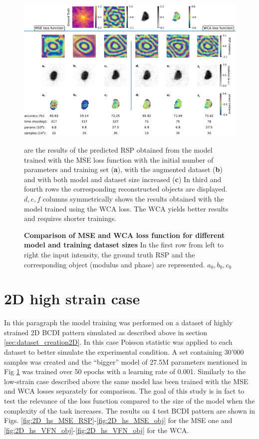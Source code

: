 \begin{figure}[H]
    \centering
    \includegraphics[width=\textwidth]{figures/Phasing/model_comparison.pdf}
    \caption{\textbf{Comparison of MSE and WCA loss function for different model and training dataset sizes} In the first 
    row from left to right the input intensity, the ground truth RSP and the corresponding object (modulus and phase) are 
    represented. \textbf{$a_0, b_0, c_0$}} are the results of the predicted RSP obtained from the model trained with the 
    MSE loss function with the initial number of parameters and training set (\textbf{a}), with the augmented dataset (\textbf{b})
    and with both model and dataset size increased (\textbf{c}) In third and fourth rows the corresponding reconstructed 
    objects are displayed. \textbf{$d, e, f$} columns symmetrically shows the results obtained with the model trained using the WCA loss. 
    The WCA yields better results and requires shorter trainings. 
    \label{fig:loss_comparison}
\end{figure}

\section{2D high strain case}

In this paragraph the model training was performed on a dataset of highly strained 2D BCDI pattern simulated as described above  
in section \ref{sec:dataset_creation2D}. In this case Poisson statistic was applied to each dataset to better simulate 
the experimental condition. A set containing 30'000 samples was created and the ``bigger'' model of 27.5M parameters mentioned in Fig 
\ref{fig:loss_comparison} was trained over 50 epochs with a learning rate of 0.001. Similarly to the low-strain case 
described above the same model has been trained with the MSE and WCA losses separately for comparison. The goal of this 
study is in fact to test the relevance of the loss function compared to the size of the model when the complexity of the 
task increases. The results on 4 test BCDI pattern are shown in Figs. \ref{fig:2D_hs_MSE_RSP}-\ref{fig:2D_hs_MSE_obj} for the MSE
one and \ref{fig:2D_hs_VFN_obj}-\ref{fig:2D_hs_VFN_obj} for the WCA.

